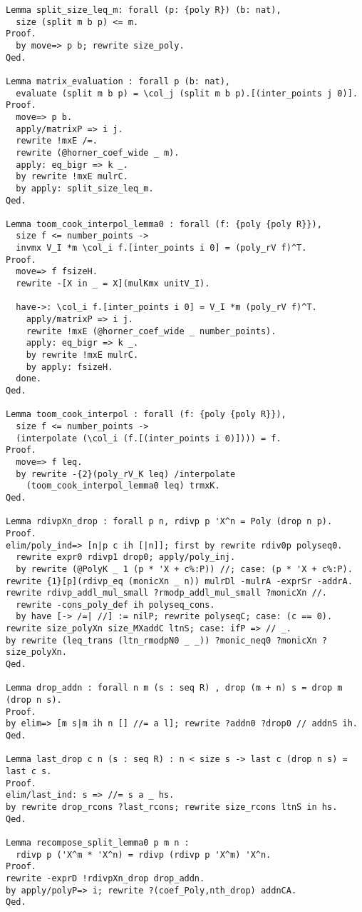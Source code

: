 \begin{lstlisting}
Lemma split_size_leq_m: forall (p: {poly R}) (b: nat),
  size (split m b p) <= m.
Proof.
  by move=> p b; rewrite size_poly.
Qed.

Lemma matrix_evaluation : forall p (b: nat),
  evaluate (split m b p) = \col_j (split m b p).[(inter_points j 0)].
Proof.
  move=> p b.
  apply/matrixP => i j.
  rewrite !mxE /=.
  rewrite (@horner_coef_wide _ m).
  apply: eq_bigr => k _.
  by rewrite !mxE mulrC.
  by apply: split_size_leq_m.
Qed.

Lemma toom_cook_interpol_lemma0 : forall (f: {poly {poly R}}),
  size f <= number_points ->
  invmx V_I *m \col_i f.[inter_points i 0] = (poly_rV f)^T.
Proof.
  move=> f fsizeH.
  rewrite -[X in _ = X](mulKmx unitV_I).

  have->: \col_i f.[inter_points i 0] = V_I *m (poly_rV f)^T.
    apply/matrixP => i j.
    rewrite !mxE (@horner_coef_wide _ number_points).
    apply: eq_bigr => k _.
    by rewrite !mxE mulrC.
    by apply: fsizeH.
  done.
Qed.

Lemma toom_cook_interpol : forall (f: {poly {poly R}}),
  size f <= number_points ->
  (interpolate (\col_i (f.[(inter_points i 0)]))) = f.
Proof.
  move=> f leq.
  by rewrite -{2}(poly_rV_K leq) /interpolate
    (toom_cook_interpol_lemma0 leq) trmxK.
Qed.

Lemma rdivpXn_drop : forall p n, rdivp p 'X^n = Poly (drop n p).
Proof.
elim/poly_ind=> [n|p c ih [|n]]; first by rewrite rdiv0p polyseq0.
  rewrite expr0 rdivp1 drop0; apply/poly_inj.
  by rewrite (@PolyK _ 1 (p * 'X + c%:P)) //; case: (p * 'X + c%:P).
rewrite {1}[p](rdivp_eq (monicXn _ n)) mulrDl -mulrA -exprSr -addrA.
rewrite rdivp_addl_mul_small ?rmodp_addl_mul_small ?monicXn //.
  rewrite -cons_poly_def ih polyseq_cons.
  by have [-> /=| //] := nilP; rewrite polyseqC; case: (c == 0).
rewrite size_polyXn size_MXaddC ltnS; case: ifP => // _.
by rewrite (leq_trans (ltn_rmodpN0 _ _)) ?monic_neq0 ?monicXn ?size_polyXn.
Qed.

Lemma drop_addn : forall n m (s : seq R) , drop (m + n) s = drop m (drop n s).
Proof.
by elim=> [m s|m ih n [] //= a l]; rewrite ?addn0 ?drop0 // addnS ih.
Qed.

Lemma last_drop c n (s : seq R) : n < size s -> last c (drop n s) = last c s.
Proof.
elim/last_ind: s => //= s a _ hs.
by rewrite drop_rcons ?last_rcons; rewrite size_rcons ltnS in hs.
Qed.

Lemma recompose_split_lemma0 p m n :
  rdivp p ('X^m * 'X^n) = rdivp (rdivp p 'X^m) 'X^n.
Proof.
rewrite -exprD !rdivpXn_drop drop_addn.
by apply/polyP=> i; rewrite ?(coef_Poly,nth_drop) addnCA.
Qed.


\end{lstlisting}

